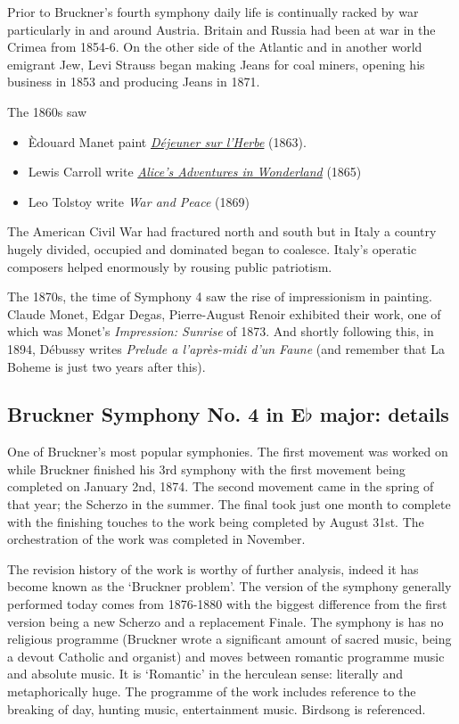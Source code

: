 Prior to Bruckner's fourth symphony daily life is continually racked by war particularly in and around Austria. Britain and Russia had been at war in the Crimea from 1854-6. On the other side of the Atlantic and in another world emigrant Jew, Levi Strauss began making Jeans for coal miners, opening his business in 1853 and producing Jeans in 1871.  

The 1860s saw 
\begin{itemize}
\item \`Edouard Manet paint \textit{\href{https://www.khanacademy.org/humanities/becoming-modern/avant-garde-france/realism/v/manet-le-d-jeuner-sur-l-herbe-luncheon-on-the-grass-1863}{D\'ejeuner sur l'Herbe}} (1863).
\item Lewis Carroll write \textit{\href{http://www.gutenberg.org/files/11/11-h/11-h.htm}{Alice's Adventures in Wonderland}} (1865)
\item Leo Tolstoy write \textit{War and Peace} (1869)
\end{itemize}

The American Civil War had fractured north and south but in Italy a country hugely divided, occupied and dominated began to coalesce. Italy's operatic composers helped enormously by rousing public patriotism.

The 1870s, the time of Symphony 4 saw the rise of impressionism in painting. Claude Monet, Edgar Degas, Pierre-August Renoir exhibited their work, one of which was Monet's \textit{Impression: Sunrise} of 1873. 
And shortly following this, in 1894, D\'ebussy writes \textit{Prelude a l'apr\`es-midi d'un Faune} (and remember that La Boheme is just two years after this). 

\subsection{Bruckner Symphony No. 4 in E$\flat$ major: details} 

One of Bruckner's most popular symphonies. The first movement was worked on while Bruckner finished his 3rd symphony with the first movement being completed on January 2nd, 1874. The second movement came in the spring of that year; the Scherzo in the summer. The final took just one month to complete with the finishing touches to the work being completed by August 31st. The orchestration of the work was completed in November. 

The revision history of the work is worthy of further analysis, indeed it has become known as the `Bruckner problem'. The version of the symphony generally performed today comes from 1876-1880 with the biggest difference from the first version being a new Scherzo and a replacement Finale. The symphony is has no religious programme (Bruckner wrote a significant amount of sacred music, being a devout Catholic and organist) and moves between romantic programme music and absolute music. It is `Romantic' in the herculean sense: literally and metaphorically huge. The programme of the work includes reference to the breaking of day, hunting music, entertainment music. Birdsong is referenced. 

